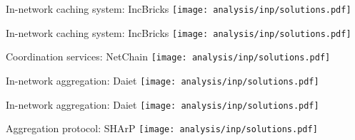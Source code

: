 \begin{frame}{In-network caching system: IncBricks}
  \centering
  \texttt{[image: analysis/inp/solutions.pdf]}
\end{frame}
\begin{frame}{In-network caching system: IncBricks}
  \centering
  \texttt{[image: analysis/inp/solutions.pdf]}
\end{frame}
\begin{frame}{Coordination services: NetChain}
  \centering
  \texttt{[image: analysis/inp/solutions.pdf]}
\end{frame}
\begin{frame}{In-network aggregation: Daiet}
  \centering
  \texttt{[image: analysis/inp/solutions.pdf]}
\end{frame}
\begin{frame}{In-network aggregation: Daiet}
  \centering
  \texttt{[image: analysis/inp/solutions.pdf]}
\end{frame}
\begin{frame}{Aggregation protocol: SHArP}
  \centering
  \texttt{[image: analysis/inp/solutions.pdf]}
\end{frame}
